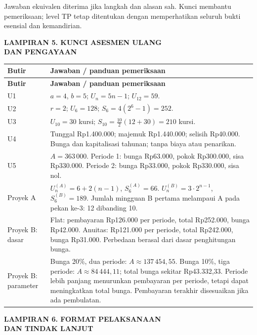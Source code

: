 \documentclass[11pt,a4paper]{article}
\begin{document}
{\small Jawaban ekuivalen diterima jika langkah dan alasan sah. Kunci membantu pemeriksaan; level TP tetap ditentukan dengan memperhatikan seluruh bukti esensial dan kemandirian.\par}\medskip
\clearpage
\begin{center}\bfseries\large LAMPIRAN 5. KUNCI ASESMEN ULANG\\[2pt] DAN PENGAYAAN\end{center}\medskip
{\small\setlength{\tabcolsep}{2mm}\renewcommand{\arraystretch}{1.35}\begin{longtable}{|>{\raggedright\arraybackslash}p{31.791mm}|>{\raggedright\arraybackslash}p{137.759mm}|}\hline
\rowcolor{gray!10}\textbf{Butir} & \textbf{Jawaban / panduan pemeriksaan}\\ \hline
\endfirsthead
\rowcolor{gray!10}\textbf{Butir} & \textbf{Jawaban / panduan pemeriksaan}\\ \hline
\endhead
U1 & \(a=4\), \(b=5\); \(U_n=5n-1\); \(U_{12}=59\).\\ \hline
U2 & \(r=2\); \(U_6=128\); \(S_6=4(2^6-1)=252\).\\ \hline
U3 & \(U_{10}=30\) kursi; \(S_{10}=\frac{10}{2}(12+30)=210\) kursi.\\ \hline
U4 & Tunggal Rp1.400.000; majemuk Rp1.440.000; selisih Rp40.000. Bunga dan kapitalisasi tahunan; tanpa biaya atau penarikan.\\ \hline
U5 & \(A=363\,000\). Periode 1: bunga Rp63.000, pokok Rp300.000, sisa Rp330.000. Periode 2: bunga Rp33.000, pokok Rp330.000, sisa nol.\\ \hline
Proyek A & \(U_n^{(A)}=6+2(n-1)\), \(S_6^{(A)}=66\). \(U_n^{(B)}=3\cdot2^{n-1}\), \(S_6^{(B)}=189\). Jumlah mingguan B pertama melampaui A pada pekan ke-3: 12 dibanding 10.\\ \hline
Proyek B: dasar & Flat: pembayaran Rp126.000 per periode, total Rp252.000, bunga Rp42.000. Anuitas: Rp121.000 per periode, total Rp242.000, bunga Rp31.000. Perbedaan berasal dari dasar penghitungan bunga.\\ \hline
Proyek B: parameter & Bunga 20\%, dua periode: \(A\approx137\,454{,}55\). Bunga 10\%, tiga periode: \(A\approx84\,444{,}11\); total bunga sekitar Rp43.332,33. Periode lebih panjang menurunkan pembayaran per periode, tetapi dapat meningkatkan total bunga. Pembayaran terakhir disesuaikan jika ada pembulatan.\\ \hline
\end{longtable}}\medskip
\clearpage
\begin{center}\bfseries\large LAMPIRAN 6. FORMAT PELAKSANAAN\\[2pt] DAN TINDAK LANJUT\end{center}\medskip
\end{document}
